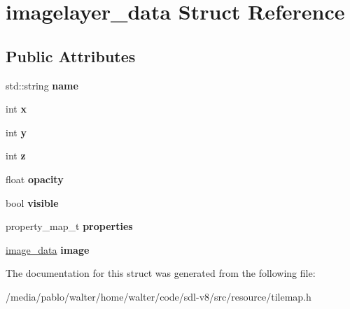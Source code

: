 \hypertarget{structimagelayer__data}{}\section{imagelayer\+\_\+data Struct Reference}
\label{structimagelayer__data}
\subsection*{Public Attributes}
\begin{DoxyCompactItemize}
\item 
\mbox{\label{structimagelayer__data_aab9d7d1ac7ff80821f6d77cd12b3b5ce}} 
std\+::string {\bfseries name}
\item 
\mbox{\label{structimagelayer__data_acf946996915a9a5473f57857db7d9086}} 
int {\bfseries x}
\item 
\mbox{\label{structimagelayer__data_a46b2a688bc46d8efad5b04ed90368dce}} 
int {\bfseries y}
\item 
\mbox{\label{structimagelayer__data_a65554934a273c6e2570e6f2e05bd93fb}} 
int {\bfseries z}
\item 
\mbox{\label{structimagelayer__data_ae8f8f59c52ca20eb899c6c8f11da7d31}} 
float {\bfseries opacity}
\item 
\mbox{\label{structimagelayer__data_a092fbb7542467a37bd8511d02cc43a54}} 
bool {\bfseries visible}
\item 
\mbox{\label{structimagelayer__data_a21bfd238bb76240f274471c870b650a5}} 
property\+\_\+map\+\_\+t {\bfseries properties}
\item 
\mbox{\label{structimagelayer__data_a24be60670f5063535a9865d923bfce31}} 
\mbox{\hyperlink{structimage__data}{image\+\_\+data}} {\bfseries image}
\end{DoxyCompactItemize}


The documentation for this struct was generated from the following file\+:\begin{DoxyCompactItemize}
\item 
/media/pablo/walter/home/walter/code/sdl-\/v8/src/resource/tilemap.\+h\end{DoxyCompactItemize}
